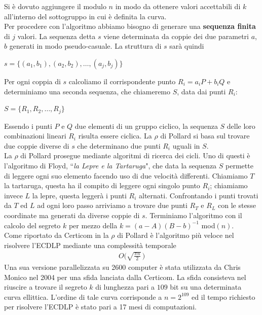 \documentclass[a4paper,12pt]{tesiinfo}
\newcommand\ddfrac[2]{\frac{\displaystyle #1}{\displaystyle #2}}
\begin{document}
Si \`e dovuto aggiungere il modulo $n$ in modo da ottenere valori accettabili di $k$ all'interno del sottogruppo in cui \`e definita la curva.
\\
Per procedere con l'algoritmo abbiamo bisogno di generare una \textbf{sequenza finita} di $j$ valori. La sequenza detta $s$ viene determinata da coppie dei due parametri $a$, $b$ generati in modo pseudo-casuale. La struttura di $s$ sar\`a quindi
\begin{center}
 $s=\{(a_1, b_1), (a_2, b_2), \ldots, (a_j, b_j)\}$ 
\end{center}
Per ogni coppia di $s$ calcoliamo il corrispondente punto $R_i = a_iP+b_iQ$ e determiniamo una seconda sequenza, che chiameremo $S$, data dai punti $R_i$:
\begin{center}
 $S=\{R_1, R_2, \ldots, R_j\}$
\end{center}
Essendo i punti $P$ e $Q$ due elementi di un gruppo ciclico, la sequenza $S$ delle loro combinazioni lineari $R_i$ risulta essere ciclica. La $\rho$ di Pollard si basa sul trovare due coppie diverse di $s$ che determinano due punti $R_i$ uguali in $S$. 
\\
La $\rho$ di Pollard prosegue mediante algoritmi di ricerca dei cicli. Uno di questi \`e l'algoritmo di Floyd, ``\textit{la Lepre e la Tartaruga}", che data la sequenza $S$ permette di leggere ogni suo elemento facendo uso di due velocit\`a differenti. Chiamiamo $T$ la tartaruga, questa ha il compito di leggere ogni singolo punto $R_i$; chiamiamo invece $L$ la lepre, questa legger\`a i punti $R_i$ alternati. Confrontando i punti trovati da $T$ ed $L$ ad ogni loro passo arriviamo a trovare due punti $R_T$ e $R_L$ con le stesse coordinate ma generati da diverse coppie di $s$. Terminiamo l'algoritmo con il calcolo del segreto $k$ per mezzo della $k=(a -A)(B -b)^{-1}$ mod$(n)$.
\\
Come riportato da Certicom in \cite{Certicom pollard p} la $\rho$ di Pollard \`e l'algoritmo pi\`u veloce nel risolvere l'ECDLP mediante una complessit\`a temporale 
\begin{gather}
 O\Big (\sqrt{\ddfrac{\pi n}{2}}\, \Big )
 \label{p parallelo}
\end{gather}
Una sua versione parallelizzata su 2600 computer \`e stata utilizzata da Chris Monico nel 2004 \cite{monico} per una sfida lanciata dalla Certicom. La sfida consisteva nel riuscire a trovare il segreto $k$ di lunghezza pari a $109$ bit su una determinata curva ellittica. L'ordine di tale curva corrisponde a $n = 2^{109}$ ed il tempo richiesto per risolvere l'ECDLP \`e stato pari a 17 mesi di computazioni.
\end{document}
